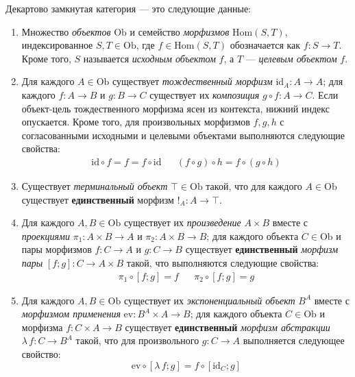 \begin{definition}
    \label{ccc}
    Декартово замкнутая категория --- это следующие
    данные:
    \begin{enumerate}
        \item Множество \textit{объектов} $\mathrm{Ob}$
            и семейство \textit{морфизмов}
            $\mathrm{Hom}(S, T)$, индексированное
            $S, T\in\mathrm{Ob}$, где
            $f\in\mathrm{Hom}(S,T)$ обозначается как
            $f:S\to T$. Кроме того, $S$ называется
            \textit{исходным объектом} $f$, а $T$ ---
            \textit{целевым объектом} $f$.
        \item Для каждого $A\in\mathrm{Ob}$ существует
            \textit{тождественный морфизм}
            $\mathrm{id}_A: A\to A$; для каждого
            $f:A\to B$ и $g:B\to C$ существует их
            \textit{композиция} $g\circ f:A\to C$.
            Если объект-цель тождественного морфизма
            ясен из контекста, нижний индекс
            опускается. Кроме того, для произвольных
            морфизмов $f, g, h$ с согласованными
            исходными и целевыми объектами выполняются
            следующие свойства:
            \begin{align*}
                \mathrm{id}\circ f = f =
                f\circ\mathrm{id} & &
                (f \circ g) \circ h =
                f \circ (g \circ h)
            \end{align*}
        \item Существует \textit{терминальный объект}
            $\top\in\mathrm{Ob}$ такой, что для каждого
            $A\in\mathrm{Ob}$ существует
            \textbf{единственный} морфизм
            $!_A:A\to\top$.
        \item Для каждого $A, B\in\mathrm{Ob}$
            существует их \textit{произведение}
            $A\times B$ вместе с \textit{проекциями}
            $\pi_1:A\times B\to A$ и
            $\pi_2:A\times B\to B$; для каждого объекта
            $C\in\mathrm{Ob}$ и пары морфизмов
            $f:C\to A$ и $g:C\to B$ существует
            \textbf{единственный} \textit{морфизм пары}
            $[f;g]:C\to A\times B$ такой, что
            выполняются следующие свойства:
            \begin{align*}
                \pi_1\circ[f;g]=f & & \pi_2\circ[f;g]=g
            \end{align*}
        \item Для каждого $A, B\in\mathrm{Ob}$
            существует их \textit{экспоненциальный
            объект} $B^A$ вместе с \textit{морфизмом
            применения} $\mathrm{ev}:B^A\times A\to B$;
            для каждого объекта $C\in\mathrm{Ob}$ и
            морфизма $f:C\times A\to B$ существует
            \textbf{единственный} \textit{морфизм
            абстракции} $\lambda\,f:C\to B^A$ такой,
            что для произвольного $g:C\to A$
            выполняется следующее свойство:
            \[
                \mathrm{ev}\circ[\lambda\,f; g]
                = f\circ[\mathrm{id}_C; g]
            \]
    \end{enumerate}
\end{definition}

